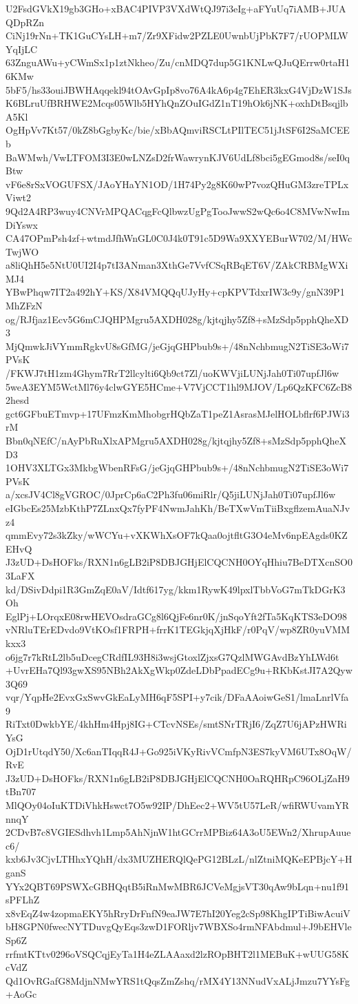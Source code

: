 U2FsdGVkX19gb3GHo+xBAC4PIVP3VXdWtQJ97i3eIg+aFYuUq7iAMB+JUAQDpRZn
CiNj19rNn+TK1GuCYsLH+m7/Zr9XFidw2PZLE0UwnbUjPbK7F7/rUOPMLWYqIjLC
63ZnguAWu+yCWmSx1p1ztNkheo/Zu/cnMDQ7dup5G1KNLwQJuQErrw0rtaH16KMw
5bF5/hs33ouiJBWHAqqekl94tOAvGpIp8vo76A4kA6p4g7EhER3kxG4VjDzW1SJs
K6BLruUfBRHWE2Mcqs05Wlb5HYhQnZOuIGdZ1nT19hOk6jNK+oxhDtBsqjlbA5Kl
OgHpVv7Kt57/0kZ8bGgbyKc/bie/xBbAQmviRSCLtPIlTEC51jJtSF6I2SaMCEEb
BaWMwh/VwLTFOM3I3E0wLNZsD2frWawrynKJV6UdLf8bci5gEGmod8s/seI0qBtw
vF6e8rSxVOGUFSX/JAoYHaYN1OD/1H74Py2g8K60wP7vozQHuGM3zreTPLxViwt2
9Qd2A4RP3wuy4CNVrMPQACqgFcQlbwzUgPgTooJwwS2wQc6o4C8MVwNwImDiYswx
CA47OPmPsh4zf+wtmdJfhWnGL0C0J4k0T91c5D9Wa9XXYEBurW702/M/HWcTwjWO
a8liQhH5e5NtU0UI2I4p7tI3ANman3XthGe7VvfCSqRBqET6V/ZAkCRBMgWXiMJ4
YBwPhqw7IT2a492hY+KS/X84VMQQqUJyHy+cpKPVTdxrIW3c9y/gnN39P1MhZFzN
og/RJfjaz1Ecv5G6mCJQHPMgru5AXDH028g/kjtqjhy5Zf8+sMzSdp5pphQheXD3
MjQmwkJiVYmmRgkvU8sGfMG/jeGjqGHPbub9s+/48nNchbmugN2TiSE3oWi7PVsK
/FKWJ7tH1zm4Ghym7RrT2llcylti6Qb9ct7Zl/uoKWVjiLUNjJah0Ti07upfJl6w
5weA3EYM5WctMl76y4clwGYE5HCme+V7VjCCT1hl9MJOV/Lp6QzKFC6ZcB82hesd
gct6GFbuETmvp+17UFmzKmMhobgrHQbZaT1peZ1AsrasMJelHOLbflrf6PJWi3rM
Bbn0qNEfC/nAyPbRuXlxAPMgru5AXDH028g/kjtqjhy5Zf8+sMzSdp5pphQheXD3
1OHV3XLTGx3MkbgWbenRFsG/jeGjqGHPbub9s+/48nNchbmugN2TiSE3oWi7PVsK
a/xcsJV4Cl8gVGROC/0JprCp6aC2Ph3fu06miRlr/Q5jiLUNjJah0Ti07upfJl6w
eIGbcEs25MzbKthP7ZLnxQx7fyPF4NwmJahKh/BeTXwVmTiiBxgflzemAuaNJvz4
qmmEvy72s3kZky/wWCYu+vXKWhXsOF7kQaa0ojtfltG3O4eMv6npEAgds0KZEHvQ
J3zUD+DsHOFks/RXN1n6gLB2iP8DBJGHjElCQCNH0OYqHhiu7BeDTXcnSO03LaFX
kd/DSivDdpi1R3GmZqE0aV/Idtf617yg/kkm1RywK49lpxlTbbVoG7mTkDGrK3Oh
EglPj+LOrqxE08rwHEVOsdraGCg8l6QjFe6nr0K/jnSqoYft2fTa5KqKTS3eDO98
vNRluTErEDvdo9VtKOsf1FRPH+frrK1TEGkjqXjHkF/r0PqV/wp8ZR0yuVMMkxx3
o6jg7r7kRtL2lb5uDcegCRdfIL93H8i3wsjGtoxlZjxsG7QzlMWGAvdBzYhLWd6t
+UvrEHa7Ql93gwXS95NBh2AkXgWkp0ZdeLDbPpadECg9u+RKbKstJI7A2Qyw3Q69
vqr/YqpHe2EvxGxSwvGkEaLyMH6qF5SPI+y7cik/DFaAAoiwGeS1/lmaLnrlVfa9
RiTxt0DwkbYE/4khHm4Hpj8IG+CTcvNSEs/smtSNrTRjI6/ZqZ7U6jAPzHWRiYsG
OjD1rUtqdY50/Xc6anTIqqR4J+Go925iVKyRivVCmfpN3ES7kyVM6UTx8OqW/RvE
J3zUD+DsHOFks/RXN1n6gLB2iP8DBJGHjElCQCNH0OaRQHRpC96OLjZaH9tBn707
MlQOy04oIuKTDiVhkHswct7O5w92IP/DhEec2+WV5tU57LeR/wfiRWUvamYRnnqY
2CDvB7c8VGIESdhvh1Lmp5AhNjnW1htGCrrMPBiz64A3oU5EWn2/XhrupAuuec6/
kxb6Jv3CjvLTHhxYQhH/dx3MUZHERQlQePG12BLzL/nlZtniMQKeEPBjcY+HganS
YYx2QBT69PSWXcGBHQqtB5iRnMwMBR6JCVeMgjsVT30qAw9bLqn+nu1f91sPFLhZ
x8vEqZ4w4zopmaEKY5hRryDrFnfN9eaJW7E7hI20Yeg2cSp98KhgIPTiBiwAcuiV
bH8GPN0fwecNYTDuvgQyEqs3zwD1FORljv7WBXSo4rmNFAbdmul+J9bEHVleSp6Z
rrfmtKTtv0296oVSQCqjEyTa1H4eZLAAaxd2lzROpBHT2l1MEBuK+wUUG58KcVdZ
Qd1OvRGafG8MdjnNMwYRS1tQqsZmZshq/rMX4Y13NNudVxALjJmzu7YYsFg+AoGc
